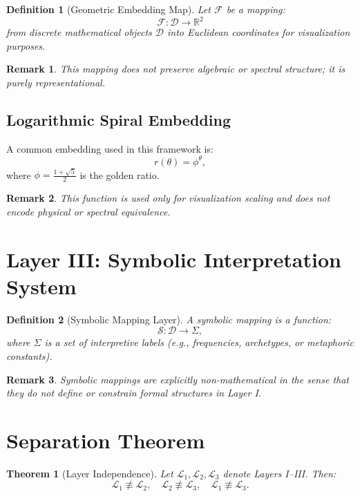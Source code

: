 \documentclass[11pt]{article}
\newtheorem{definition}{Definition}
\newtheorem{theorem}{Theorem}
\newtheorem{remark}{Remark}
\begin{document}
\begin{definition}[Geometric Embedding Map]
Let $\mathcal{F}$ be a mapping:
\[
\mathcal{F}: \mathcal{D} \rightarrow \mathbb{R}^2
\]
from discrete mathematical objects $\mathcal{D}$ into Euclidean coordinates for visualization purposes.
\end{definition}

\begin{remark}
This mapping does not preserve algebraic or spectral structure; it is purely representational.
\end{remark}

\subsection{Logarithmic Spiral Embedding}

A common embedding used in this framework is:
\[
r(\theta) = \phi^{\theta},
\]
where $\phi = \frac{1+\sqrt{5}}{2}$ is the golden ratio.

\begin{remark}
This function is used only for visualization scaling and does not encode physical or spectral equivalence.
\end{remark}

\section{Layer III: Symbolic Interpretation System}

\begin{definition}[Symbolic Mapping Layer]
A symbolic mapping is a function:
\[
\mathcal{S}: \mathcal{D} \rightarrow \Sigma,
\]
where $\Sigma$ is a set of interpretive labels (e.g., frequencies, archetypes, or metaphoric constants).
\end{definition}

\begin{remark}
Symbolic mappings are explicitly non-mathematical in the sense that they do not define or constrain formal structures in Layer I.
\end{remark}

\section{Separation Theorem}

\begin{theorem}[Layer Independence]
Let $\mathcal{L}_1, \mathcal{L}_2, \mathcal{L}_3$ denote Layers I--III. Then:
\[
\mathcal{L}_1 \not\equiv \mathcal{L}_2, \quad
\mathcal{L}_2 \not\equiv \mathcal{L}_3, \quad
\mathcal{L}_1 \not\equiv \mathcal{L}_3.
\]
\end{theorem}
\end{document}
